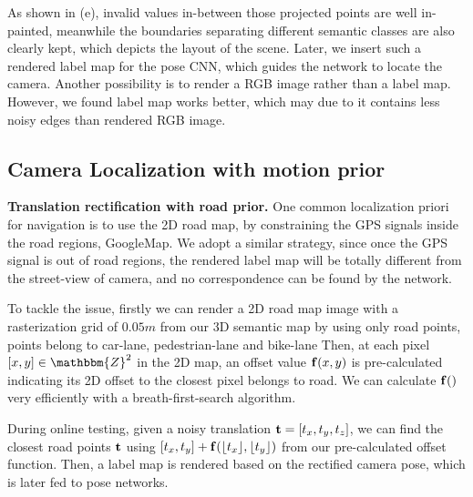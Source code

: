 As shown in (e), invalid values in-between those projected points are well in-painted, meanwhile the boundaries separating different semantic classes are also clearly kept, which depicts the layout of the scene. Later, we insert such a rendered label map for the pose CNN, which guides the network to locate the camera.
Another possibility is to render a RGB image rather than a label map. However, we found label map works better, which may due to it contains less noisy edges than rendered RGB image.

\subsection{Camera Localization with motion prior}

\textbf{Translation rectification with road prior.} One common localization priori for navigation is to use the 2D road map, by constraining the GPS signals inside the road regions, \eg GoogleMap. We adopt a similar strategy, since once the GPS signal is out of road regions, the rendered label map will be totally different from the street-view of camera, and no correspondence can be found by the network. 

To tackle the issue,
firstly we can render a 2D road map image with a rasterization grid of $0.05m$ from our 3D semantic map by using only road points, \ie points belong to car-lane, pedestrian-lane and bike-lane \etc
Then, at each pixel $[x, y] \in \mathbbm{Z}^2$ in the 2D map, an offset value ${\mathbf f}(x, y)$ is pre-calculated indicating its 2D offset to the closest pixel belongs to road. We can calculate ${\mathbf f}()$ very efficiently with a breath-first-search algorithm.

During online testing, given a noisy translation ${\mathbf t}=[t_x, t_y, t_z]$, we can find the closest road points \wrt ${\mathbf t}$ using $[t_x, t_y] + {\mathbf f}(\lfloor t_x \rfloor, \lfloor t_y \rfloor)$ from our pre-calculated offset function. Then, a label map is rendered based on the rectified camera pose, which is later fed to pose networks.

